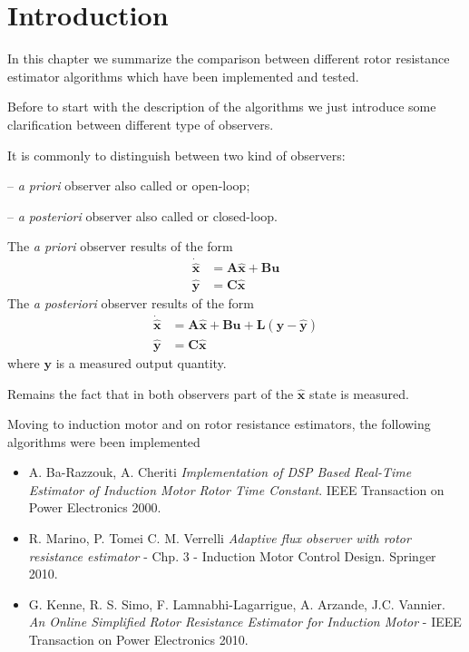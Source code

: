 \documentclass[11pt,a4paper,oneside]{book}
\numberwithin{equation}{section}
\theoremstyle{it}
\theoremstyle{definition}
\newenvironment{myitemize_3}
{ \begin{itemize}[topsep=4pt]
		\setlength{\topsep}{4pt}
		\setlength{\itemsep}{4pt}
		\setlength{\parskip}{4pt}
		\setlength{\parsep}{6pt}     }
	{ \end{itemize}                  }
\begin{document}
\section{Introduction}
In this chapter we summarize the comparison between different rotor resistance estimator algorithms which have been implemented and tested.

Before to start with the description of the algorithms we just introduce some clarification between different type of observers. 

It is commonly to distinguish between two kind of observers:
\begin{myitemize_3}
	\item[--] \textit{a priori} observer also called  or open-loop;
	\item[--] \textit{a posteriori} observer also called  or closed-loop.
\end{myitemize_3}

The \textit{a priori} observer results of the form
\begin{equation}
	\begin{split}
		\dot{\hat{\boldsymbol{x}}} & = \boldsymbol{A} \hat{\boldsymbol{x}} + \boldsymbol{B}\boldsymbol{u} \\[6pt]
		\hat{\boldsymbol{y}} & = \boldsymbol{C}\hat{\boldsymbol{x}}
	\end{split}
\end{equation}
The \textit{a posteriori} observer results of the form
\begin{equation}
	\begin{split}
		\dot{\hat{\boldsymbol{x}}} & = \boldsymbol{A} \hat{\boldsymbol{x}} + \boldsymbol{B}\boldsymbol{u}
		 + \boldsymbol{L}\left(\boldsymbol{y}-\hat{\boldsymbol{y}}\right)\\[6pt]
		\hat{\boldsymbol{y}} & = \boldsymbol{C}\hat{\boldsymbol{x}}
	\end{split}
\end{equation}
where $\boldsymbol{y}$ is a measured output quantity.

Remains the fact that in both observers part of the $\hat{\boldsymbol{x}}$ state is measured.

Moving to induction motor and on rotor resistance estimators, the following algorithms were been implemented
\begin{itemize}
	\item A. Ba-Razzouk, A. Cheriti \textit{Implementation of DSP Based Real-Time Estimator of Induction Motor Rotor Time Constant}. IEEE Transaction on Power Electronics 2000.
	\item R. Marino, P. Tomei C. M. Verrelli \textit{Adaptive flux observer with rotor resistance estimator} - Chp. 3 - Induction Motor Control Design. Springer 2010.
	\item G. Kenne, R. S. Simo, F. Lamnabhi-Lagarrigue, A. Arzande, J.C. Vannier. \textit{An Online Simplified Rotor Resistance Estimator for Induction Motor} - IEEE Transaction on Power Electronics 2010.
\end{itemize}
\end{document}
